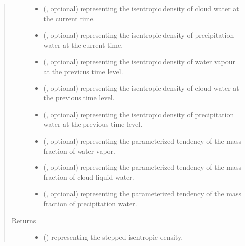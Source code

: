 \documentclass[letterpaper,10pt,english]{sphinxmanual}
\begin{document}
\begin{fulllineitems}
\begin{fulllineitems}
\begin{quote}
\begin{description}
\begin{itemize}
\item {} 
 (, optional) \textendash{}  representing the isentropic density of cloud water at the current time.

\item {} 
 (, optional) \textendash{}  representing the isentropic density of precipitation water at the current time.

\item {} 
 (, optional) \textendash{}  representing the isentropic density of water vapour at the previous time level.

\item {} 
 (, optional) \textendash{}  representing the isentropic density of cloud water at the previous time level.

\item {} 
 (, optional) \textendash{}  representing the isentropic density of precipitation water at the previous time level.

\item {} 
 (, optional) \textendash{}  representing the parameterized tendency of the mass fraction of water vapor.

\item {} 
 (, optional) \textendash{}  representing the parameterized tendency of the mass fraction of cloud liquid water.

\item {} 
 (, optional) \textendash{}  representing the parameterized tendency of the mass fraction of precipitation water.

\end{itemize}

\item[{Returns}] \leavevmode
\begin{itemize}
\item {} 
 () \textendash{}  representing the stepped isentropic density.


\end{itemize}
\end{description}
\end{quote}
\end{fulllineitems}
\end{fulllineitems}
\end{document}
